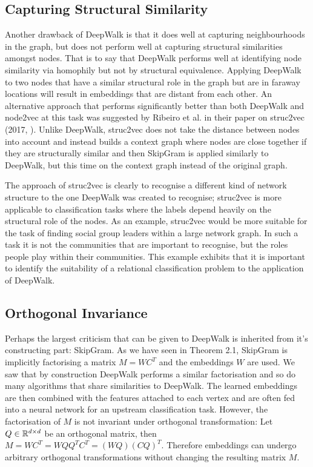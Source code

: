 \documentclass[a4paper]{article}
\begin{document}
\subsection{Capturing Structural Similarity}
Another drawback of DeepWalk is that it does well at capturing neighbourhoods in the graph, but does not perform well
at capturing structural similarities amongst nodes. That is to say that DeepWalk
performs well at identifying node similarity via homophily but not by structural equivalence. Applying DeepWalk to two nodes
that have a similar structural role in the graph but are in faraway locations
will result in embeddings that are distant from each other. An alternative
approach that performs significantly better than both DeepWalk and node2vec at this task was suggested by
Ribeiro et al. in their paper on struc2vec (2017, \cite{ribeiro2017}). Unlike DeepWalk, struc2vec does not
take the distance between nodes into account and instead builds a context graph
where nodes are close together if they are structurally similar and then
SkipGram is applied similarly to DeepWalk, but this time on the
context graph instead of the original graph.

The approach of struc2vec is clearly to recognise a different kind of network
structure to the one DeepWalk was created to recognise; struc2vec is more
applicable to classification tasks where the labels depend heavily on the
structural role of the nodes. As an example, struc2vec would be more suitable
for the task of finding social group leaders within a large network
graph. In such a task it is not the communities that are important to recognise,
but the roles people play within their communities. This example exhibits that it is
important to identify the suitability of a relational classification problem \cite{deepwalk} to
the application of DeepWalk.
\subsection{Orthogonal Invariance}
Perhaps the largest criticism that can be given to DeepWalk is inherited from it's constructing part: SkipGram. As we have
seen in Theorem 2.1, SkipGram is implicitly factorising a matrix $M = WC^T$ and the embeddings $W$ are used. We saw that
by construction DeepWalk performs a similar factorisation and so do many algorithms that share similarities to DeepWalk. The
learned embeddings are then combined with the features attached to each vertex and are often fed into a neural network for an
upstream classification task. However, the factorisation of $M$ is not invariant under orthogonal transformation: Let $Q \in \R^{d \times d}$
be an orthogonal matrix, then $M = WC^T = WQQ^TC^T = (WQ)(CQ)^T$. Therefore embeddings can undergo arbitrary orthogonal transformations
without changing the resulting matrix $M$.
\end{document}
